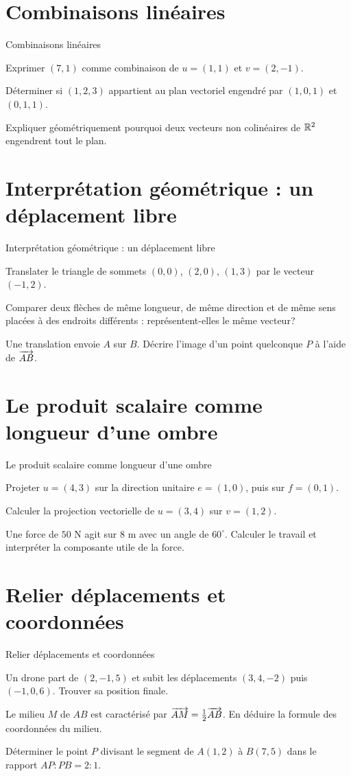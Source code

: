 \section{Combinaisons linéaires}
\label{workbook:section:09.05}
\begin{exerciseblock}{Combinaisons linéaires}
\item Exprimer $(7,1)$ comme combinaison de $u=(1,1)$ et $v=(2,-1)$.
\item Déterminer si $(1,2,3)$ appartient au plan vectoriel engendré par $(1,0,1)$ et $(0,1,1)$.
\item Expliquer géométriquement pourquoi deux vecteurs non colinéaires de $\mathbb{R}^2$ engendrent tout le plan.
\end{exerciseblock}
\section{Interprétation géométrique : un déplacement libre}
\label{workbook:section:09.06}
\begin{exerciseblock}{Interprétation géométrique : un déplacement libre}
\item Translater le triangle de sommets $(0,0)$, $(2,0)$, $(1,3)$ par le vecteur $(-1,2)$.
\item Comparer deux flèches de même longueur, de même direction et de même sens placées à des endroits différents : représentent-elles le même vecteur?
\item Une translation envoie $A$ sur $B$. Décrire l'image d'un point quelconque $P$ à l'aide de $\overrightarrow{AB}$.
\end{exerciseblock}
\section{Le produit scalaire comme longueur d'une ombre}
\label{workbook:section:09.07}
\begin{exerciseblock}{Le produit scalaire comme longueur d'une ombre}
\item Projeter $u=(4,3)$ sur la direction unitaire $e=(1,0)$, puis sur $f=(0,1)$.
\item Calculer la projection vectorielle de $u=(3,4)$ sur $v=(1,2)$.
\item Une force de $50$ N agit sur $8$ m avec un angle de $60^\circ$. Calculer le travail et interpréter la composante utile de la force.
\end{exerciseblock}
\section{Relier déplacements et coordonnées}
\label{workbook:section:09.08}
\begin{exerciseblock}{Relier déplacements et coordonnées}
\item Un drone part de $(2,-1,5)$ et subit les déplacements $(3,4,-2)$ puis $(-1,0,6)$. Trouver sa position finale.
\item Le milieu $M$ de $AB$ est caractérisé par $\overrightarrow{AM}=\frac12\overrightarrow{AB}$. En déduire la formule des coordonnées du milieu.
\item Déterminer le point $P$ divisant le segment de $A(1,2)$ à $B(7,5)$ dans le rapport $AP:PB=2:1$.
\end{exerciseblock}
